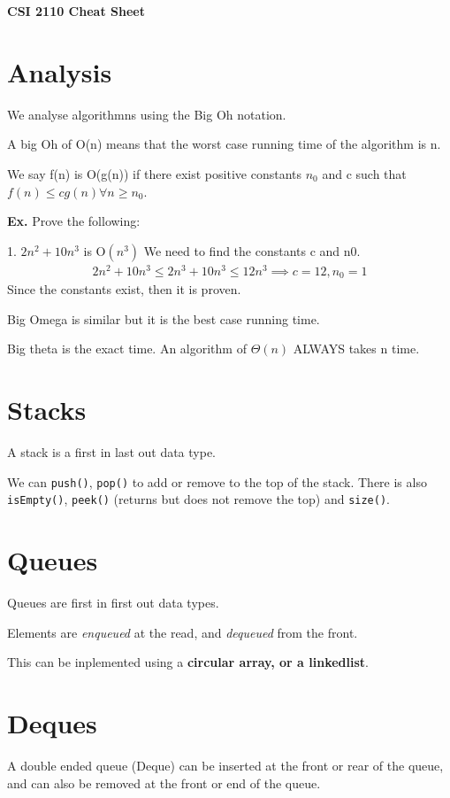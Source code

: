 \documentclass[12pt,letterpaper]{article} \usepackage{amsmath} \usepackage{graphicx} \usepackage[margin=1in]{geometry} \usepackage{longtable}  \usepackage{amssymb}
\begin{document}
	
	\begin{center}
		\Large\textbf{CSI 2110 Cheat Sheet} \\
		\vspace{0.5em}
	\end{center}
	
	\section{Analysis}
	We analyse algorithmns using the Big Oh notation. 
	
	A big Oh of O(n) means that the worst case running time of the algorithm is n.
	
	We say f(n) is O(g(n)) if there exist positive constants $n_0$ and c such that $f(n)\le cg(n) \forall n\ge n_0$.
	
	\begin{mdframed}
		\textbf{Ex. } Prove the following: 
		
		1. $2n^2 + 10n^3$ is O$(n^3)$
		We need to find the constants c and n0. 
		\begin{align*}
			2n^2 + 10n^3 \le 2n^3 + 10n^3 \le 12n^3 \implies c=12, n_0 = 1
		\end{align*}
		Since the constants exist, then it is proven.
	\end{mdframed}

	Big Omega is similar but it is the best case running time. 
	
	Big theta is the exact time. An algorithm of $\Theta(n)$ ALWAYS takes n time.
	
	\section{Stacks}
	A stack is a first in last out data type.
	
	We can \verb|push()|, \verb|pop()| to add or remove to the top of the stack. There is also \verb|isEmpty()|, \verb|peek()| (returns but does not remove the top) and \verb|size()|.
	
	\section{Queues}
	Queues are first in first out data types. 
	
	Elements are \textit{enqueued} at the read, and \textit{dequeued} from the front. 
	
	This can be inplemented using a \textbf{circular array, or a linkedlist}. 
	
	\section{Deques}
	A double ended queue (Deque) can be inserted at the front or rear of the queue, and can also be removed at the front or end of the queue. 
	
\end{document}
